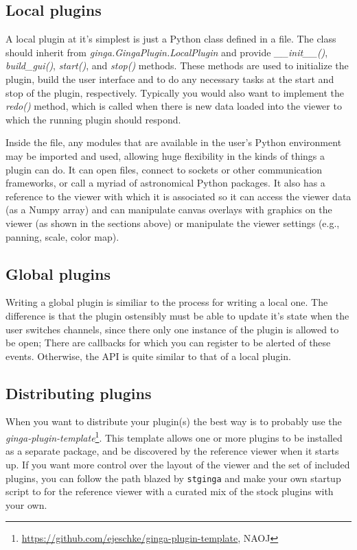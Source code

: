 \documentclass[11pt,twoside]{article}
\begin{document}
\subsection{Local plugins}

A local plugin at it's simplest is just a Python class defined in a file.
The class should inherit from {\em ginga.GingaPlugin.LocalPlugin}
and provide {\em \_\_init\_\_()}, {\em build\_gui()},
{\em start()}, and {\em stop()} methods.
These methods are used to initialize the
plugin, build the user interface and to do any necessary tasks at the
start and stop of the plugin, respectively. Typically you would also
want to implement the {\em redo()} method, which is called when there is
new data loaded into the viewer to which the running plugin should respond.

Inside the file, any modules that are available in the user's Python
environment may be imported and used, allowing huge flexibility in
the kinds of things a plugin can do.  It can open files, connect to
sockets or other communication frameworks, or call a myriad of
astronomical Python packages.  It also has a reference to the viewer with
which it is associated so it can access the viewer data (as a Numpy array)
and can manipulate canvas overlays with graphics on the viewer (as shown
in the sections above) or manipulate the viewer settings (e.g., panning,
scale, color map).

\subsection{Global plugins}

Writing a global plugin is similiar to the process for writing a local
one.  The difference is that the plugin ostensibly must be able to
update it's state when the user switches channels, since there only
one instance of the plugin is allowed to be open; There are callbacks
for which you can register to be alerted of these events. Otherwise,
the API is quite similar to that of a local plugin.

\subsection{Distributing plugins}

When you want to distribute your plugin(s) the best way is to probably use
the {\em ginga-plugin-template}\footnote{\url{https://github.com/ejeschke/ginga-plugin-template}, NAOJ}.
This template allows one
or more plugins to be installed as a separate package, and be
discovered by the reference viewer when it starts up.  If you want
more control over the layout of the viewer and the set of included
plugins, you can follow the path blazed by {\tt stginga} and make your own
startup script to for the reference viewer with a curated mix of the
stock plugins with your own.
\end{document}
